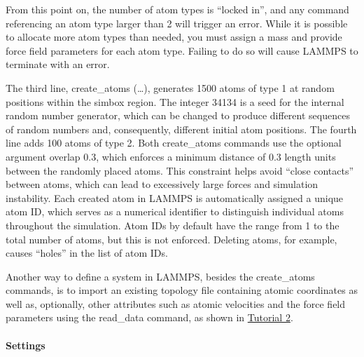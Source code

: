 \documentclass[9pt,tutorial]{livecoms}
\newcommand{\lmpcmd}[1]{\colorbox{listing}{\textcolor{command}{\small{#1}}}} %
\begin{document}
\begin{note}
  From this point on, the number of atom types is ``locked
  in'', and any command referencing an atom type larger than 2 will
  trigger an error.  While it is possible to allocate more atom types
  than needed, you must assign a mass and provide force field parameters
  for each atom type.  Failing to do so will cause LAMMPS to terminate
  with an error.
\end{note}

The third line, \lmpcmd{create\_atoms (\dots)}, generates 1500 atoms of
type 1 at random positions within the \lmpcmd{simbox} region.
The integer 34134 is a seed for the internal random
number generator, which can be changed to produce different sequences of
random numbers and, consequently, different initial atom positions.  The
fourth line adds 100 atoms of type 2.  Both \lmpcmd{create\_atoms}
commands use the optional argument \lmpcmd{overlap 0.3}, which enforces
a minimum distance of 0.3 length units between the
randomly placed atoms.  This constraint helps avoid ``close contacts''
between atoms, which can lead to excessively large forces and simulation
instability. Each created atom in LAMMPS is automatically assigned a
unique atom ID, which serves as a numerical identifier to distinguish
individual atoms throughout the simulation.  Atom IDs by default have
the range from 1 to the total number of atoms, but this is not
enforced.  Deleting atoms, for example, causes ``holes'' in the list
of atom IDs.

\begin{note}
  Another way to define a system in LAMMPS, besides the
  \lmpcmd{create\_atoms} commands, is to import an existing topology
  file containing atomic coordinates as well as, optionally, other
  attributes such as atomic velocities and the force field parameters
  using the \lmpcmd{read\_data} command, as shown in
  \hyperref[carbon-nanotube-label]{Tutorial 2}.
\end{note}

\paragraph{Settings}
\end{document}
